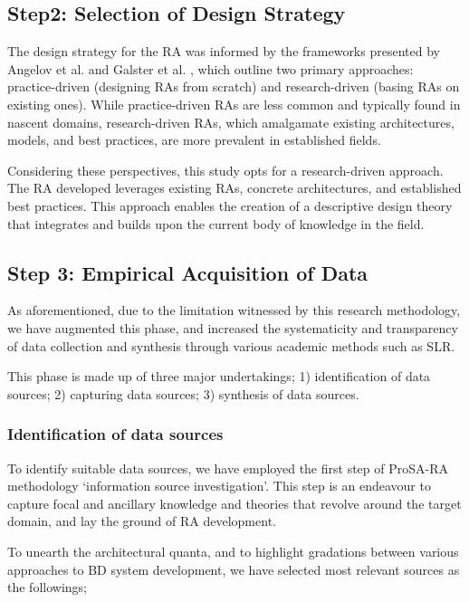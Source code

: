 \documentclass[review]{elsarticle}
\begin{document}
\subsection{Step2: Selection of Design Strategy}

The design strategy for the RA was informed by the frameworks presented by Angelov et al. \cite{angelov2008towards} and Galster et al. \cite{galster2011empirically}, which outline two primary approaches: practice-driven (designing RAs from scratch) and research-driven (basing RAs on existing ones). While practice-driven RAs are less common and typically found in nascent domains, research-driven RAs, which amalgamate existing architectures, models, and best practices, are more prevalent in established fields.

Considering these perspectives, this study opts for a research-driven approach. The RA developed leverages existing RAs, concrete architectures, and established best practices. This approach enables the creation of a descriptive design theory that integrates and builds upon the current body of knowledge in the field.


\subsection{Step 3: Empirical Acquisition of Data } \label{theSLR}

As aforementioned, due to the limitation witnessed by this research methodology, we have augmented this phase, and increased the systematicity and transparency of data collection and synthesis through various academic methods such as SLR.

This phase is made up of three major undertakings; 1) identification of data sources; 2) capturing data sources; 3) synthesis of data sources.

\subsubsection{Identification of data sources}

To identify suitable data sources, we have employed the first step of ProSA-RA methodology `information source investigation'. This step is an endeavour to capture focal and ancillary knowledge and theories that revolve around the target domain, and lay the ground of RA development.

To unearth the architectural quanta, and to highlight gradations between various approaches to BD system development, we have selected most relevant sources as the followings;
\end{document}

